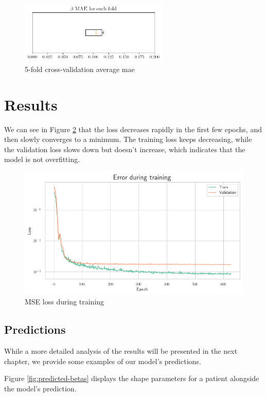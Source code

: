 \begin{figure}[H]
    \centering
    \includegraphics[width=200pt]{files/average_mae.png}
    \caption{5-fold cross-validation average \gls{mae}}
    \label{fig:cross-validation}
\end{figure}

\section{Results}

We can see in Figure \ref{fig:loss} that the loss decreases rapidly in the
first few epochs, and then slowly converges to a minimum. The training loss
keeps decreasing, while the validation loss slows down but doesn't increase,
which indicates that the model is not overfitting.

\begin{figure}[H]
    \centering
    \includegraphics[width=\textwidth]{files/loss}
    \caption{MSE loss during training}
    \label{fig:loss}
\end{figure}

\subsection{Predictions}

While a more detailed analysis of the results will be presented in the next
chapter, we provide some examples of our model's predictions.

Figure \ref{fig:predicted-betas} displays the shape parameters for a patient
alongside the model's prediction.

